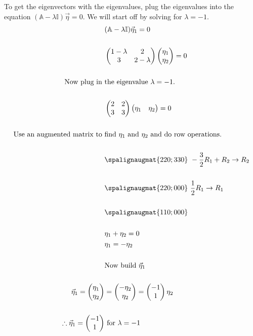 \documentclass{jhwhw}
\begin{document}
To get the eigenvectors with the eigenvalues, plug the eigenvalues into the equation \((\mathbb{A}- \lambda \mathbb{I})\vec\eta = 0\). We will start off by solving for \(\lambda = -1\).
\\
\begin{align*}
&(\mathbb{A}-\lambda \mathbb{I})\vec\eta_1 = 0\\ \\
    &\begin{pmatrix}
    1-\lambda & 2 \\ 3 & 2-\lambda
\end{pmatrix}\begin{pmatrix}
    \eta_1 \\ \eta_2
\end{pmatrix} = 0 \\ \\
    \text{Now plug in } & \text{the eigenvalue } \lambda = -1. \\ \\
    &\begin{pmatrix}
        2 & 2 \\ 3 & 3
    \end{pmatrix}\begin{pmatrix}
        \eta_1 & \eta_2
    \end{pmatrix} = 0 \\ \\
    \text{Use an augmented matrix to } &\text{find } \eta_1 \text{ and } \eta_2 \text{ and do row operations}. \\ \\ 
    &\spalignaugmat{2 2 0; 3 3 0} \text{ } -\frac{3}{2}R_1 + R_2\rightarrow R_2 \\ \\ 
    &\spalignaugmat{2 2 0; 0 0 0} \text{ } \frac{1}{2}R_1 \rightarrow R_1 \\ \\
    &\spalignaugmat{1 1 0; 0 0 0} \text{ } \\ \\ 
    &\eta_1 + \eta_2 = 0 \\
    &\eta_1 = -\eta_2 \\ \\
    &\text{Now build } \vec\eta_1 \\ \\
    \vec\eta_1 = \begin{pmatrix}
        \eta_1 \\ \eta_2
    \end{pmatrix} &= \begin{pmatrix}
        -\eta_2 \\ \eta_2
    \end{pmatrix} = \begin{pmatrix}
        -1 \\ 1
    \end{pmatrix}\eta_2 \\ \\
    \therefore \vec\eta_1 = \begin{pmatrix}
        -1 \\ 1
    \end{pmatrix} &\text{ for } \lambda = -1 \\
\end{align*}
\end{document}
